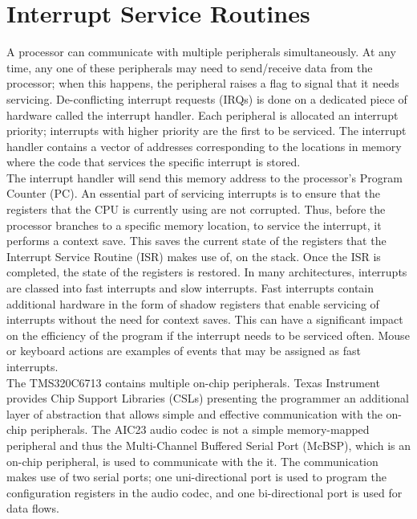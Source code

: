\documentclass{article}
\begin{document}
\section{Interrupt Service Routines}\label{sec:interrupt_service_routines}
A processor can communicate with multiple peripherals simultaneously. At any time, any one of these peripherals may need to send/receive data from the processor; when this happens, the peripheral raises a flag to signal that it needs servicing. De-conflicting interrupt requests (IRQs) is done on a dedicated piece of hardware called the interrupt handler. Each peripheral is allocated an interrupt priority; interrupts with higher priority are the first to be serviced. The interrupt handler contains a vector of addresses corresponding to the locations in memory where the code that services the specific interrupt is stored. \\

The interrupt handler will send this memory address to the processor's Program Counter (PC). An essential part of servicing interrupts is to ensure that the registers that the CPU is currently using are not corrupted. Thus, before the processor branches to a specific memory location, to service the interrupt, it performs a context save. This saves the current state of the registers that the Interrupt Service Routine (ISR) makes use of, on the stack. Once the ISR is completed, the state of the registers is restored. In many architectures, interrupts are classed into fast interrupts and slow interrupts. Fast interrupts contain additional hardware in the form of shadow registers that enable servicing of interrupts without the need for context saves. This can have a significant impact on the efficiency of the program if the interrupt needs to be serviced often. Mouse or keyboard actions are examples of events that may be assigned as fast interrupts.\\

The TMS320C6713 contains multiple on-chip peripherals. Texas Instrument provides Chip Support Libraries (CSLs) presenting the programmer an additional layer of abstraction that allows simple and effective communication with the on-chip peripherals. The AIC23 audio codec is not a simple memory-mapped peripheral and thus the Multi-Channel Buffered Serial Port (McBSP), which is an on-chip peripheral, is used to communicate with the it. The communication makes use of two serial ports; one uni-directional port is used to program the configuration registers in the audio codec, and one bi-directional port is used for data flows. \\
\end{document}
